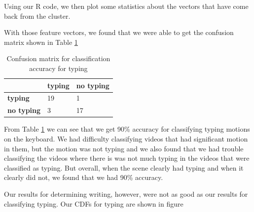 Using our R code, we then plot some statistics about the vectors that have come
back from the cluster.



With those feature vectors, we found that we were able to get the confusion matrix
shown in Table \ref{tab:typing_confusion}
\begin{table}[h]
  \begin{centering}
  \begin{tabular}{| l | l | l |}
  \hline
   & \textbf{typing} & \textbf{no typing}\\ \hline
  \textbf{typing} & 19 & 1 \\ \hline
  \textbf{no typing} & 3 & 17 \\ \hline
  \end{tabular}
  \caption{Confusion matrix for classification accuracy for typing}
  \label{tab:typing_confusion}
\end{centering}
\end{table}

\FloatBarrier

From Table \ref{tab:typing_confusion} we can see that we get 90\% accuracy for
classifying typing motions on the keyboard. We had difficulty classifying
videos that had significant motion in them, but the motion was not typing and
we also found that we had trouble classifying the videos where there is was
not much typing in the videos that were classified as typing. But overall, when the
scene clearly had typing and when it clearly did not, we found that we had
90\% accuracy.

Our results for determining writing, however, were not as good as our results
for classifying typing. Our CDFs for typing are shown in figure

